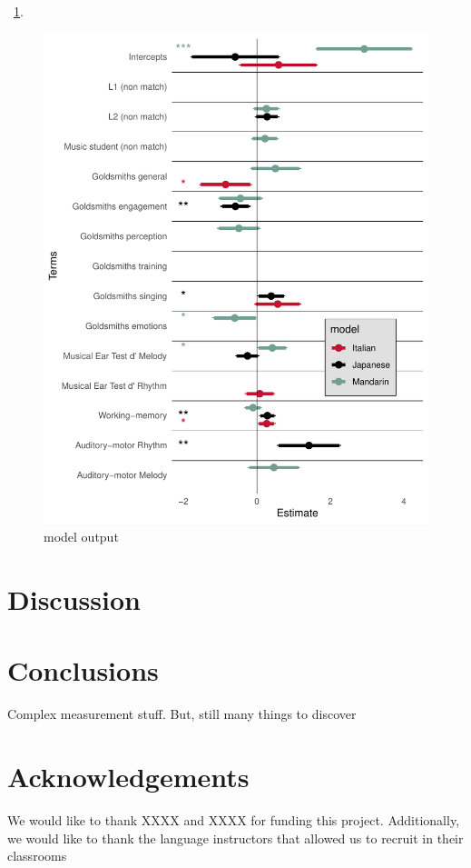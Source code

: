 \documentclass[a4paper]{article}
\begin{document}
~\ref{fig:model}.

\begin{figure}[t]
  \centering
  \includegraphics[width=\linewidth]{SP_24_visuals/Japanese,Italian,_Mandarin_max_models_structure:_parsimonious_effects.pdf}
  \caption{model output}
  \label{fig:model}
\end{figure}

\section{Discussion}

\section{Conclusions}

Complex measurement stuff. But, still many things to discover

\section{Acknowledgements}

We would like to thank XXXX and XXXX for funding this project. Additionally, we would like to thank the language instructors that allowed us to recruit in their classrooms\\




\end{document}
